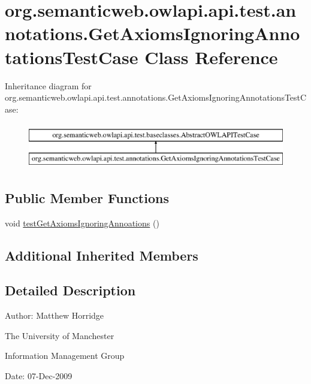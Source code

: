 \hypertarget{classorg_1_1semanticweb_1_1owlapi_1_1api_1_1test_1_1annotations_1_1_get_axioms_ignoring_annotations_test_case}{\section{org.\-semanticweb.\-owlapi.\-api.\-test.\-annotations.\-Get\-Axioms\-Ignoring\-Annotations\-Test\-Case Class Reference}
\label{classorg_1_1semanticweb_1_1owlapi_1_1api_1_1test_1_1annotations_1_1_get_axioms_ignoring_annotations_test_case}
}
Inheritance diagram for org.\-semanticweb.\-owlapi.\-api.\-test.\-annotations.\-Get\-Axioms\-Ignoring\-Annotations\-Test\-Case\-:\begin{figure}[H]
\begin{center}
\leavevmode
\includegraphics[height=2.000000cm]{classorg_1_1semanticweb_1_1owlapi_1_1api_1_1test_1_1annotations_1_1_get_axioms_ignoring_annotations_test_case}
\end{center}
\end{figure}
\subsection*{Public Member Functions}
\begin{DoxyCompactItemize}
\item 
void \hyperlink{classorg_1_1semanticweb_1_1owlapi_1_1api_1_1test_1_1annotations_1_1_get_axioms_ignoring_annotations_test_case_a7d28f70060444ac14f4a0c4be9931f7e}{test\-Get\-Axioms\-Ignoring\-Annoations} ()
\end{DoxyCompactItemize}
\subsection*{Additional Inherited Members}


\subsection{Detailed Description}
Author\-: Matthew Horridge\par
 The University of Manchester\par
 Information Management Group\par
 Date\-: 07-\/\-Dec-\/2009 

